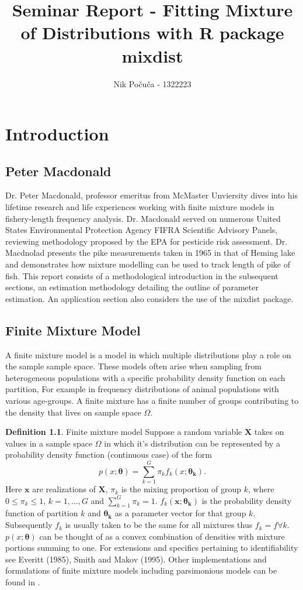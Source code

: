 \documentclass[12pt,letterpaper]{report}
\theoremstyle{definition}
\newtheorem{definition}{Definition}[section]
\begin{document}
\author{Nik Po\v cu\v ca -  1322223}
\title{Seminar Report - Fitting Mixture of Distributions with R package mixdist}
\maketitle
\chapter{Introduction}
\section{Peter Macdonald}
Dr. Peter Macdonald, professor emeritus from McMaster Unviersity dives into his lifetime research and life experiences working with finite mixture models in fishery-length frequency analysis. Dr. Macdonald served on numerous United States Environmental Protection Agency FIFRA Scientific Advisory Panels, reviewing methodology proposed by the EPA for pesticide risk assessment. Dr. Macdnolad presents the pike measurements taken in 1965 in that of Heming lake and demonstrates how mixture modelling can be used to track length of pike of fish. This report consists of a methodological introduction in the subsequent sections, an estimation methodology detailing the outline of parameter estimation. An application section also considers the use of the mixdist package. 


\section{Finite Mixture Model}
A finite mixture model is a model in which multiple distributions play a role on the sample sample space. These models often arise when sampling from heterogeneous populations with a specific probability density function on each partition, For example in frequency distributions of animal populations with various age-groups. A finite mixture has a finite number of groups contributing to the density that lives on sample space $\Omega$. 

\begin{definition}{Finite mixture model}
Suppose a random variable $\bm{X}$ takes on values in a sample space $\Omega$ in which it's distribution can be represented by a probability density function (continuous case) of the form 
$$p( x ; \bm{\theta}) = \sum_{k=1}^G \pi_k f_k(x; \bm{\theta_k}).$$
Here $\bm{x}$ are realizations of $\bm X$, $\pi_k$ is the mixing proportion of group $k$, where $0 \leq \pi_k \leq 1$, $k= 1, \dots, G$ and $\sum_{k=1}^G \pi_k = 1$.  $f_k(\bm{x}; \bm{\theta_k})$ is the probability density function of partition $k$ and $\bm{\theta_k}$ as a parameter vector for that group $k$. Subsequently $f_k$ is usually taken to be the same for all mixtures thus $f_k = f \forall k$. $p(x; \bm{ \theta})$ can be thought of as a convex combination of densities with mixture portions summing to one. For  extensions and specifics pertaining to identifiability see Everitt (1985), Smith and Makov (1995). Other implementations and formulations of finite mixture models  including parsimonious models can be found in \cite{mixdist}. 

\end{definition}
\end{document}
